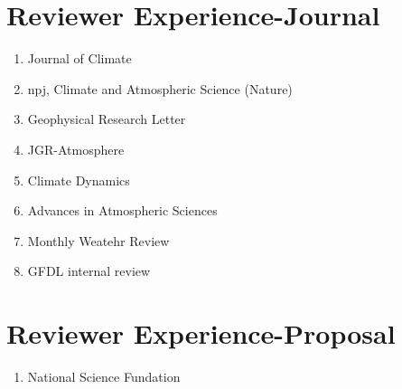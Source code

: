 \documentclass{article}
\begin{document}
\section{\color{airforceblue}Reviewer Experience-Journal}
\begin{enumerate}
	\item Journal of Climate 
	\item npj, Climate and Atmospheric Science (Nature)
	\item Geophysical Research Letter
	\item JGR-Atmosphere
	\item Climate Dynamics
	\item Advances in Atmospheric Sciences
	\item Monthly Weatehr Review
	\item GFDL internal review
\end{enumerate}
\section{\color{airforceblue}Reviewer Experience-Proposal}
\begin{enumerate}
	\item National Science Fundation
\end{enumerate}
\end{document}
